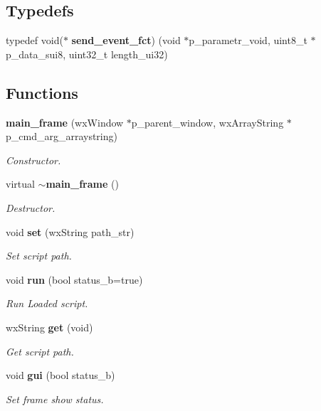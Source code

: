\subsection*{Typedefs}
\begin{DoxyCompactItemize}
\item 
typedef void($\ast$ \textbf{ send\+\_\+event\+\_\+fct}) (void $\ast$p\+\_\+parametr\+\_\+void, uint8\+\_\+t $\ast$p\+\_\+data\+\_\+sui8, uint32\+\_\+t length\+\_\+ui32)
\end{DoxyCompactItemize}
\subsection*{Functions}
\begin{DoxyCompactItemize}
\item 
\textbf{ main\+\_\+frame} (wx\+Window $\ast$p\+\_\+parent\+\_\+window, wx\+Array\+String $\ast$p\+\_\+cmd\+\_\+arg\+\_\+arraystring)
\begin{DoxyCompactList}\small\item\em Constructor. \end{DoxyCompactList}\item 
virtual \textbf{ $\sim$main\+\_\+frame} ()
\begin{DoxyCompactList}\small\item\em Destructor. \end{DoxyCompactList}\item 
void \textbf{ set} (wx\+String path\+\_\+str)
\begin{DoxyCompactList}\small\item\em Set script path. \end{DoxyCompactList}\item 
void \textbf{ run} (bool status\+\_\+b=true)
\begin{DoxyCompactList}\small\item\em Run Loaded script. \end{DoxyCompactList}\item 
wx\+String \textbf{ get} (void)
\begin{DoxyCompactList}\small\item\em Get script path. \end{DoxyCompactList}\item 
void \textbf{ gui} (bool status\+\_\+b)
\begin{DoxyCompactList}\small\item\em Set frame show status. \end{DoxyCompactList}\item 

\end{DoxyCompactItemize}
